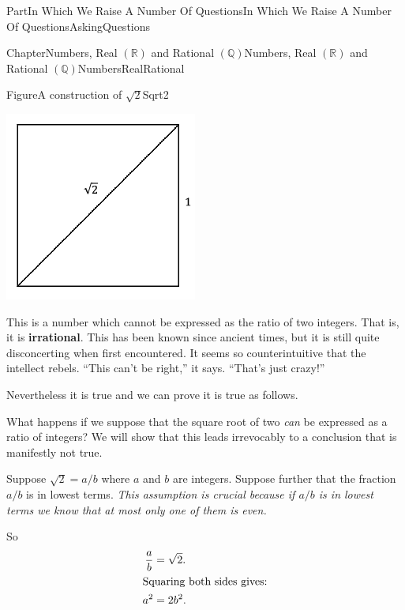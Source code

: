 \documentclass[oneside,10pt,]{book}
\newcommand{\terminology}[1]{\textbf{#1}}
\numberwithin{equation}{part}
\newcommand{\RR}{\mathbb {R}}
\newcommand{\QQ}{\mathbb {Q}}
\newcommand{\amp}{&}
\begin{document}
\begin{partptx}{Part}{In Which We Raise A Number Of Questions}{}{In Which We Raise A Number Of Questions}{}{}{AskingQuestions}
\begin{chapterptx}{Chapter}{Numbers, Real \(\left(\RR\right)\) and Rational \(\left(\QQ\right)\)}{}{Numbers, Real \(\left(\RR\right)\) and Rational \(\left(\QQ\right)\)}{}{}{NumbersRealRational}
\begin{figureptx}{Figure}{A construction of \(\sqrt{2}\)}{Sqrt2}{}
\begin{image}{0.325}{0.35}{0.325}{}
\includegraphics[width=\linewidth]{external/images/Sqrt2.png}
\end{image}%
\tcblower
\end{figureptx}%
This is a number which cannot be expressed as the ratio of two integers.  That is, it is \terminology{irrational}. This has been known since ancient times, but it is still quite disconcerting when first encountered.  It seems so counter\textendash{}intuitive that the intellect rebels.  ``This can't be right,'' it says. ``That's just crazy!''%
\par
Nevertheless it is true and we can prove it is true as follows.%
\par
What happens if we suppose that the square root of two \emph{can} be expressed as a ratio of integers? We will show that this leads irrevocably to a conclusion that is manifestly not true.%
\par
Suppose \(\sqrt{2}=a/b\) where \(a\) and \(b\) are integers. Suppose further that the fraction \(a/b\) is in lowest terms. \emph{This assumption is crucial because if \(a/b\) is in lowest terms we know that at most only one of them is even.}%
\par
So%
\begin{align*}
\frac{a}{b} \amp = \sqrt{2}.\\
\intertext{Squaring both sides gives:}
a^2 \amp = 2b^2.\\

\end{align*}
\end{chapterptx}
\end{partptx}
\end{document}
